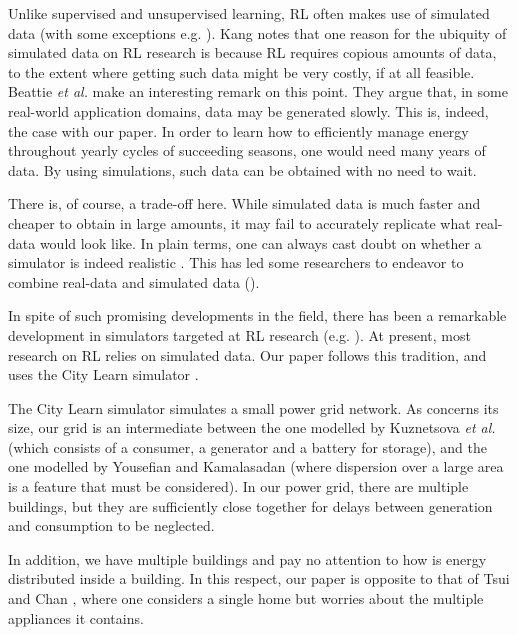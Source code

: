 \documentclass{article}
\begin{document}

Unlike supervised and unsupervised learning, RL often makes use of simulated data (with some exceptions e.g. \cite{Xu2020}). Kang \cite{Kang2019} notes that one reason for the ubiquity of simulated data on RL research is because RL requires copious amounts of data, to the extent where getting such data might be very costly, if at all feasible.  Beattie \emph{et al.} \cite{DeepMind2021} make an interesting remark on this point. They argue that, in some real-world application domains, data may be generated slowly. This is, indeed, the case with our paper. In order to learn how to efficiently manage  energy throughout yearly cycles of succeeding seasons, one would need many years of data. By using simulations, such data can be obtained with no need to wait. 

There is, of course, a trade-off here. While simulated data is much faster and cheaper to obtain in large amounts, it may fail to accurately replicate what real-data would look like. In plain terms, one can always cast doubt on whether a simulator is indeed realistic \cite{Dulac2019}. This has led some researchers to endeavor to combine real-data and simulated data (\cite{Kang2019, Hanna2019, Mocanu2019}). 

In spite of such promising developments in the field, there has been a remarkable development in simulators targeted at RL research (e.g. \cite{DeepMind2021, OpenAIGym}). At present, most research on RL relies on simulated data. Our paper follows this tradition, and uses the City Learn simulator \cite{Vazquez-Canteli2019}.

The City Learn simulator simulates a small power grid network. As concerns its size, our grid is an intermediate between the one modelled by Kuznetsova \emph{et al.} \cite{Kuznetsova2013} (which consists of a consumer, a generator and a battery for storage), and the one modelled by Yousefian and Kamalasadan \cite{Yousefian2016} (where dispersion over a large area is a feature that must be considered). In our power grid, there are multiple buildings, but they are sufficiently close together for delays between generation and consumption to be neglected. 

In addition, we have multiple buildings and pay no attention to how is energy distributed inside a building. In this respect, our paper is opposite to that of Tsui and Chan \cite{Tsui2012}, where one considers a single home but worries about the multiple appliances it contains. 
\end{document}
